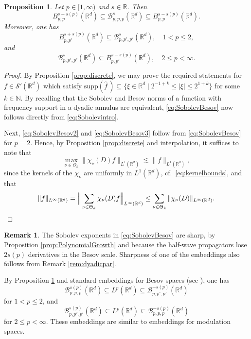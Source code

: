 \documentclass{amsart}
\newtheorem{proposition}[theorem]{Proposition}
\theoremstyle{definition}
\newtheorem{remark}[theorem]{Remark}
\newcommand{\R}{\mathbb{R}}
\newcommand{\N}{\mathbb{N}}
\newcommand {\Rd}{\mathbb{R}^{d}}
\newcommand {\Ba}{\mathcal{B}}
\newcommand {\Basppp}{\mathcal{B}^{s}_{p,p,p}(\Rd)}
\newcommand {\supp}{\mathrm{supp}}
\newcommand{\wh}{\widehat}
\newcommand {\Sw}{\mathcal{S}}
\numberwithin{equation}{section}
\begin{document}
\begin{proposition}\label{prop:Sobolev}
Let $p\in[1,\infty)$ and $s\in\R$. Then
\begin{equation}\label{eq:SobolevBesov}
B^{s+s(p)}_{p,p}(\Rd)\subseteq\Basppp\subseteq B^{s-s(p)}_{p,p}(\Rd).
\end{equation}
Moreover, one has 
\begin{equation}\label{eq:SobolevBesov2}
B^{s+s(p)}_{p,p'}(\Rd)\subseteq \Ba^{s}_{p,p',p'}(\Rd),\quad 1< p\leq 2,
\end{equation}
and
\begin{equation}\label{eq:SobolevBesov3}
\Ba^{s}_{p,p',p'}(\Rd)\subseteq B^{s-s(p)}_{p,p'}(\Rd),\quad 2\leq p<\infty.
\end{equation}
\end{proposition}
\begin{proof}
By Proposition \ref{prop:discrete}, we may prove the required statements for $f\in\Sw'(\Rd)$ which satisfy $\supp(\wh{f}\,)\subseteq\{\xi\in\Rd\mid 2^{-1+k}\leq |\xi|\leq 2^{1+k}\}$ for some $k\in\N$. By recalling that the Sobolev and Besov norms of a function with frequency support in a dyadic annulus are equivalent, \eqref{eq:SobolevBesov} now follows directly from \eqref{eq:Sobolevintro}. 

Next, \eqref{eq:SobolevBesov2} and \eqref{eq:SobolevBesov3} follow from \eqref{eq:SobolevBesov} for $p=2$. Hence, by Proposition \ref{prop:discrete} and interpolation, it suffices to note that
\[
\max_{\nu\in\Theta_{k}}\|\chi_{\nu}(D)f\|_{L^{1}(\Rd)}\lesssim \|f\|_{L^{1}(\Rd)},
\]
since the kernels of the $\chi_{\nu}$ are uniformly in $L^{1}(\Rd)$, cf.~\eqref{eq:kernelbounds}, and that
\[
\|f\|_{L^{\infty}(\Rd)}=\Big\|\sum_{\nu\in\Theta_{k}}\chi_{\nu}(D)f\Big\|_{L^{\infty}(\Rd)}\leq \sum_{\nu\in\Theta_{k}}\|\chi_{\nu}(D)\|_{L^{\infty}(\Rd)}.\qedhere
\]
\end{proof}

\begin{remark}\label{rem:sharpness}
The Sobolev exponents in \eqref{eq:SobolevBesov} are sharp, by Proposition \ref{prop:PolynomialGrowth} and because the half-wave propagators lose $2s(p)$ derivatives in the Besov scale. Sharpness of one of the embeddings also follows from Remark \ref{rem:dyadicpar}.
\end{remark}

By Proposition \ref{prop:Sobolev} and standard embeddings for Besov spaces (see \cite[Section 2.3.2]{Triebel10}), one has
\[
\Ba^{s(p)}_{p,p,p}(\Rd) \subseteq L^p(\Rd) \subseteq \Ba^{-s(p)}_{p,p',p'}(\Rd)
\]
for $1<p\leq 2$, and 
\begin{equation}\label{eq:EmbeddingLargep}
\Ba^{s(p)}_{p,p',p'}(\Rd) \subseteq L^p(\Rd) \subseteq \Ba^{-s(p)}_{p,p,p}(\Rd)
\end{equation}
for $2\leq p<\infty$. These embeddings are similar to embeddings for modulation spaces.
\end{document}
